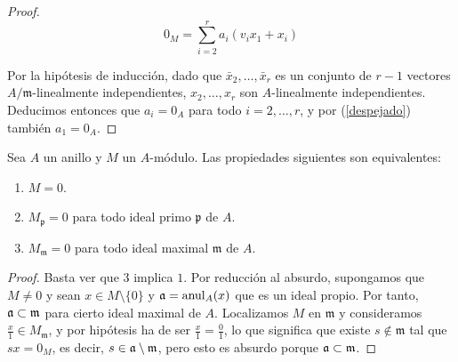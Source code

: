 \documentclass[../main.tex]{subfiles}
\begin{document}
\begin{proof}
$$
0_M = \sum_{i=2}^r a_i(v_ix_1+x_i)
$$

Por la hipótesis de inducción, dado que $\bar x_2, \dots, \bar x_r$ es un conjunto de $r-1$ vectores $A/\mathfrak{m}$-linealmente independientes, $ x_2, \dots, x_r$ son $A$-linealmente independientes. Deducimos entonces que $a_i=0_A$ para todo $i=2,\dots,r$, y por (\ref{despejado}) también $a_1 = 0_A$.

\end{proof}

\begin{proposition}
Sea $A$ un anillo y $M$ un $A$-módulo. Las propiedades siguientes son equivalentes:
\begin{enumerate}
	\item $M= 0$.
	\item $M_\mathfrak{p} = 0$ para todo ideal primo $\mathfrak{p}$ de $A$.
	\item $M_{\mathfrak{m}} = 0$ para todo ideal maximal $\mathfrak{m}$ de $A$.
\end{enumerate}
\end{proposition}
\begin{proof}
	Basta ver que $3$ implica $1$. Por reducción al absurdo, supongamos que $M\neq 0$ y sean $x\in M \setminus \{0\}$ y $\mathfrak{a} = \operatorname{anul}_A(x)$ que es un ideal propio. Por tanto, $\mathfrak{a} \subset \mathfrak{m}$ para cierto ideal maximal de $A$.
	Localizamos $M$ en $\mathfrak{m}$ y consideramos $\frac{x}{1}\in M_\mathfrak{m}$, y por hipótesis ha de ser $\frac{x}{1}=\frac{0}{1}$, lo que significa que existe $s\not\in \mathfrak{m}$ tal que $sx = 0_{M}$, es decir, $s\in \mathfrak{a} \setminus \mathfrak{m}$, pero esto es absurdo porque $\mathfrak{a} \subset \mathfrak{m}$.
\end{proof}
\end{document}
